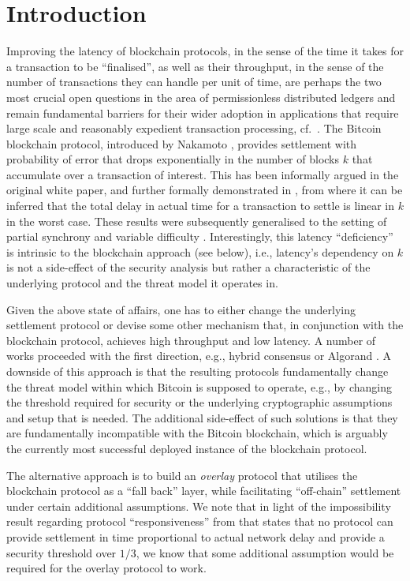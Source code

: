 
\section{Introduction}
\label{sec:intro}

Improving the latency of blockchain protocols, 
in the sense of the time it takes for a transaction to be ``finalised'',  
as well as their throughput, in the sense of the number of transactions they can handle per unit of time, 
are perhaps the two most crucial 
open questions in the area of permissionless distributed ledgers
and remain fundamental barriers for their wider adoption in applications that  require large scale  and reasonably expedient transaction processing, cf.~\cite{scaling}.
The Bitcoin blockchain protocol, introduced by Nakamoto \cite{bitcoin}, 
provides settlement with probability of error that drops exponentially
in the number of blocks $k$ that accumulate over a transaction of interest. 
This has been informally argued in the original white paper, 
and further formally demonstrated in \cite{gkl}, 
from where it can be inferred that the total delay in actual time 
for a transaction to settle
is linear in $k$ in the worst case. These results were subsequently
generalised to the setting of partial synchrony \cite{PSS16} and 
variable difficulty \cite{DBLP:conf/crypto/GarayKL17}. 
Interestingly, this latency ``deficiency'' is 
intrinsic to the blockchain approach (see below), i.e., 
latency's  dependency on $k$ is not a side-effect of the security analysis
but rather a characteristic of the underlying protocol and the threat model it
operates in. 

Given the above state of affairs, one has to either
change the underlying settlement protocol or devise some other mechanism that, 
in conjunction with the blockchain protocol, achieves high throughput and low
latency.
A number of works proceeded with the first direction, e.g., hybrid consensus
\cite{DBLP:conf/wdag/PassS17} or Algorand \cite{DBLP:journals/corr/Micali16}. A downside of this approach is that the resulting protocols fundamentally change the threat model within which Bitcoin is supposed to operate, e.g., 
by changing the threshold required for security or the underlying cryptographic assumptions and setup that is needed. 
The additional side-effect of such solutions is that they are fundamentally incompatible with the Bitcoin blockchain, which is arguably  the currently most successful deployed instance  of the  blockchain protocol. 

The alternative approach is to build an {\em overlay} protocol that utilises the blockchain protocol as a ``fall back'' layer, while facilitating ``off-chain'' settlement under certain additional assumptions. We note that in light of the impossibility result regarding protocol ``responsiveness''  from \cite{DBLP:conf/wdag/PassS17} that states that no protocol can provide settlement in time proportional to actual network delay and provide a security threshold over $1/3$, we know that some additional assumption would be required for the overlay protocol to work.  

